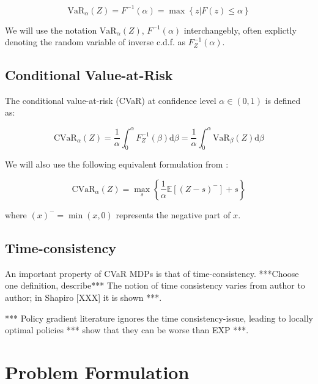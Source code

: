 \begin{equation}
\text{VaR}_\alpha(Z)=F^{-1}(\alpha)=\max\left\lbrace z | F(z) \le \alpha \right\rbrace
\end{equation}

We will use the notation $\text{VaR}_\alpha(Z)$, $F^{-1}(\alpha)$ interchangebly, often explictly denoting the random variable of inverse c.d.f. as $F^{-1}_Z(\alpha)$.

\subsection{Conditional Value-at-Risk}
The conditional value-at-risk (CVaR) at confidence level $\alpha \in (0,1)$ is defined as:

\begin{equation}
\text{CVaR}_\alpha(Z) = \dfrac{1}{\alpha}\int_0^\alpha F^{-1}_Z(\beta) \text{d}\beta = \dfrac{1}{\alpha}\int_0^\alpha \text{VaR}_\beta(Z) \text{d}\beta
\end{equation}

We will also use the following equivalent formulation from \cite{rockafellar2000optimization}:

\begin{equation}\label{eq:cvardef}
\text{CVaR}_\alpha(Z)=
\max_s\left\lbrace \dfrac{1}{\alpha}\mathbb{E}
\left[ (Z-s)^-\right] + s  \right\rbrace 
\end{equation}

where $(x)^- = \min(x, 0)$ represents the negative part of $x$.


\subsection{Time-consistency}
An important property of CVaR MDPs is that of time-consistency. ***Choose one definition, describe*** The notion of time consistency varies from author to author; in Shapiro [XXX] it is shown ***.

*** Policy gradient literature ignores the time consistency-issue, leading to locally optimal policies *** show that they can be worse than EXP ***.



\section{Problem Formulation}\label{sec:prelim:problem}


